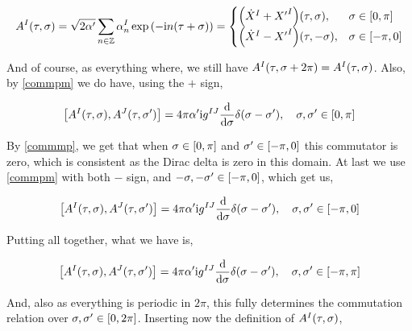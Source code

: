 \begin{align*}
    A^I\qty(\tau,\sigma)=\sqrt{2\alpha'}\sum\limits_{n\in\mathbb Z}\alpha_n^I\exp\qty(-\textnormal{i} n\qty(\tau+ \sigma))=\begin{cases}
        \qty({\dot X}^I+{X'}^I)\qty(\tau,\sigma),& \sigma\in\qty[0,\pi]\\
        \qty({\dot X}^I-{X'}^I)\qty(\tau,-\sigma),& \sigma\in\qty[-\pi,0]
    \end{cases}
\end{align*}

And of course, as everything where, we still have $A^I\qty(\tau,\sigma+2\pi)=A^I\qty(\tau,\sigma)$. Also, by \ref{commpm} we do have, using the $+$ sign,

\begin{align*}
    \comm{A^I\qty(\tau,\sigma)}{A^J\qty(\tau,\sigma')}=4\pi\alpha'\im g^{IJ}\dv{}{\sigma}\delta\qty(\sigma-\sigma'),\ \ \ \sigma,\sigma'\in\qty[0,\pi]
\end{align*}

By \ref{commmp}, we get that when $\sigma\in\qty[0,\pi]$ and $\sigma'\in\qty[-\pi,0]$ this commutator is zero, which is consistent as the Dirac delta is 
zero in this domain. At last we use \ref{commpm} with both $-$ sign, and $-\sigma,-\sigma'\in\qty[-\pi,0]$, which get us,

\begin{align*}
    \comm{A^I\qty(\tau,\sigma)}{A^J\qty(\tau,\sigma')}=4\pi\alpha'\im g^{IJ}\dv{}{\sigma}\delta\qty(\sigma-\sigma'),\ \ \ \sigma,\sigma'\in\qty[-\pi,0]
\end{align*}

Putting all together, what we have is,

\begin{align*}
    \comm{A^I\qty(\tau,\sigma)}{A^J\qty(\tau,\sigma')}=4\pi\alpha'\im g^{IJ}\dv{}{\sigma}\delta\qty(\sigma-\sigma'),\ \ \ \sigma,\sigma'\in\qty[-\pi,\pi]
\end{align*}

And, also as everything is periodic in $2\pi$, this fully determines the commutation relation over $\sigma,\sigma'\in\qty[0,2\pi]$. Inserting now the definition of 
$A^I\qty(\tau,\sigma)$,


